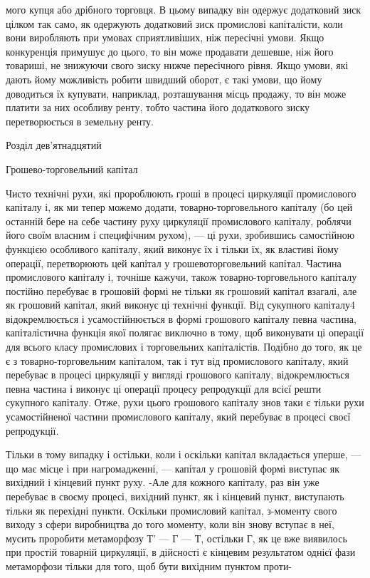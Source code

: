 мого купця або дрібного торговця. В цьому випадку він одержує
додатковий зиск цілком так само, як одержують додатковий зиск
промислові капіталісти, коли вони виробляють при умовах сприятливіших,
ніж пересічні умови. Якщо конкуренція примушує до
цього, то він може продавати дешевше, ніж його товариші, не
знижуючи свого зиску нижче пересічного рівня. Якщо умови,
які дають йому можливість робити швидший оборот, є такі
умови, що йому доводиться їх купувати, наприклад, розташування
місць продажу, то він може платити за них особливу ренту,
тобто частина його додаткового зиску перетворюється в земельну
ренту.

Розділ дев’ятнадцятий

Грошево-торговельний капітал

Чисто технічні рухи, які пророблюють гроші в процесі циркуляції
промислового капіталу і, як ми тепер можемо додати,
товарно-торговельного капіталу (бо цей останній бере на себе
частину руху циркуляції промислового капіталу, роблячи його
своїм власним і специфічним рухом), — ці рухи, зробившись самостійною
функцією особливого капіталу, який виконує їх і тільки їх,
як властиві йому операції, перетворюють цей капітал у грошевоторговельний
капітал. Частина промислового капіталу і, точніше
кажучи, також товарно-торговельного капіталу постійно перебуває
в грошовій формі не тільки як грошовий капітал взагалі, але
як грошовий капітал, який виконує ці технічні функції. Від сукупного
капіталу4 відокремлюється і усамостійнюється в формі грошового
капіталу певна частина, капіталістична функція якої
полягає виключно в тому, щоб виконувати ці операції для всього
класу промислових і торговельних капіталістів. Подібно до того,
як це є з товарно-торговельним капіталом, так і тут від промислового
капіталу, який перебуває в процесі циркуляції у вигляді
грошового капіталу, відокремлюється певна частина і виконує
ці операції процесу репродукції для всієї решти сукупного капіталу.
Отже, рухи цього грошового капіталу знов таки є тільки
рухи усамостійненої частини промислового капіталу, який перебуває
в процесі своєї репродукції.

Тільки в тому випадку і остільки, коли і оскільки капітал
вкладається уперше, — що має місце і при нагромадженні, — капітал
у грошовій формі виступає як вихідний і кінцевий пункт руху.
-Але для кожного капіталу, раз він уже перебуває в своєму
процесі, вихідний пункт, як і кінцевий пункт, виступають тільки
як перехідні пункти. Оскільки промисловий капітал, з-моменту
свого виходу з сфери виробництва до того моменту, коли він
знову вступає в неї, мусить проробити метаморфозу Т' — Г — Т,
остільки Г, як це вже виявилось при простій товарній
циркуляції, в дійсності є кінцевим результатом однієї фази метаморфози
тільки для того, щоб бути вихідним пунктом проти-
